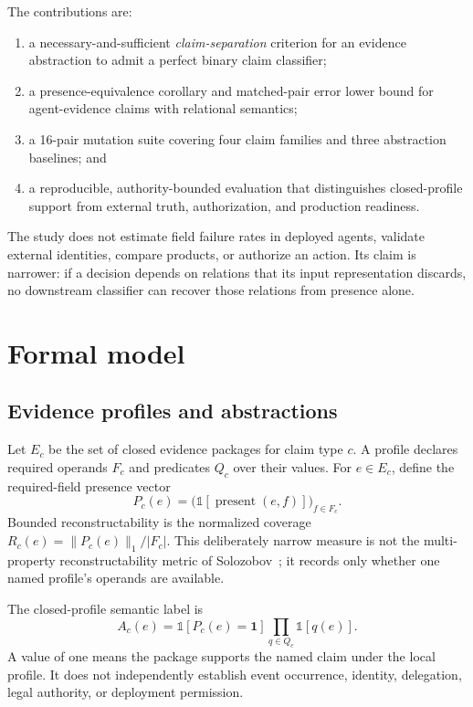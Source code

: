 \documentclass[preprint,12pt]{elsarticle}
\begin{document}
The contributions are:

\begin{enumerate}
  \item a necessary-and-sufficient \emph{claim-separation} criterion for an evidence abstraction to admit a perfect binary claim classifier;
  \item a presence-equivalence corollary and matched-pair error lower bound for agent-evidence claims with relational semantics;
  \item a 16-pair mutation suite covering four claim families and three abstraction baselines; and
  \item a reproducible, authority-bounded evaluation that distinguishes closed-profile support from external truth, authorization, and production readiness.
\end{enumerate}

The study does not estimate field failure rates in deployed agents, validate external identities, compare products, or authorize an action. Its claim is narrower: if a decision depends on relations that its input representation discards, no downstream classifier can recover those relations from presence alone.

\section{Formal model}

\subsection{Evidence profiles and abstractions}

Let $E_c$ be the set of closed evidence packages for claim type $c$. A profile declares required operands $F_c$ and predicates $Q_c$ over their values. For $e\in E_c$, define the required-field presence vector
\begin{equation}
 P_c(e)=\bigl(\mathbb{1}[\operatorname{present}(e,f)]\bigr)_{f\in F_c}.
 \label{eq:presence}
\end{equation}
Bounded reconstructability is the normalized coverage $R_c(e)=\lVert P_c(e)\rVert_1/|F_c|$. This deliberately narrow measure is not the multi-property reconstructability metric of Solozobov~\cite{solozobov2026load}; it records only whether one named profile's operands are available.

The closed-profile semantic label is
\begin{equation}
 A_c(e)=\mathbb{1}[P_c(e)=\mathbf{1}]
          \prod_{q\in Q_c}\mathbb{1}[q(e)].
 \label{eq:adequacy}
\end{equation}
A value of one means the package supports the named claim under the local profile. It does not independently establish event occurrence, identity, delegation, legal authority, or deployment permission.
\end{document}
